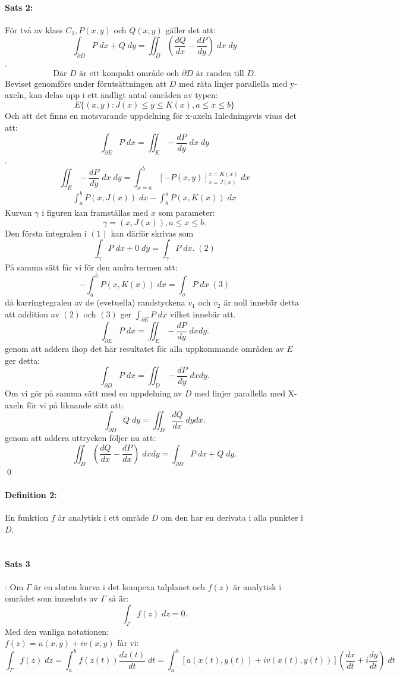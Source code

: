 \documentclass{article}
\begin{document}
\paragraph{Sats 2:} För två av klass $C_1, P(x, y)$ och $Q(x, y)$ gäller det att:
$$\int_{\partial D} P\; dx + Q \; dy = \iint_D \left ( \frac {d Q} {d x} - \frac {d P} {d y}
	\right ) \; dx \; dy$$.
$$\text{Där $D$ är ett kompakt område och $\partial D$ är randen till $D$.}$$
Beviset genomförs under förutsättningen att $D$ med räta linjer parallella med y-axeln, kan delas upp i ett 
ändligt antal områden av typen:
$$E \{ (x, y): J(x) \le y \le K(x), a \le x \le b \}$$
Och att det finns en motsvarande uppdelning för x-axeln
Inledningsvis visas det att:
$$\int_{\partial E} P \; dx = \iint_E - \frac {dP} {dy} \; dx \; dy$$.
$$\iint_E - \frac {dP} {dy} \; dx \; dy = \int^b_{x=a} \left [ -P (x, y) \right ]^{x = K(x)}_{x= J(x)} \; dx$$
\begin{align}
	\int_a^bP(x, J(x)) \; dx - \int_b^aP(x, K(x)) \; dx
\end{align}
Kurvan $\gamma$ i figuren kan framställas med $x$ som parameter:
$$\gamma = (x, J(x)), a\le x \le b.$$
Den första integralen i $(1)$ kan därför skrivas som 
$$\int_{\gamma} P \; dx + 0 \; dy = \int_{\gamma} P \; dx. \; (2)$$
På samma sätt får vi för den andra termen att:
$$- \int_a^b P(x, K(x)) \; dx = \int_{\sigma} P \; dx \; (3)$$ %
då karringtegralen av de (evetuella) randstyckena $v_1$ och $v_2$ är noll innebär detta att
addition av $(2)$ och $(3)$ ger $\int_{\partial E} P \; dx$ vilket
innebär att.
$$\int_{\partial E} P \; dx = \iint_E - \frac {dP} {dy} \; dx dy.$$
genom att addera ihop det här resultatet för alla uppkommande områden av $E$ ger detta:
$$\int_{\partial D} P \; dx = \iint_D - \frac {dP} {dy} \; dx dy.$$
Om vi gör på samma sätt med en uppdelning av $D$ med linjer parallella med X-axeln för vi på liknande sätt att:
$$\int_{\partial D} Q \; dy = \iint_D \frac {dQ} {dx} \; dy dx.$$ 
genom att addera uttrycken följer nu att:
$$\iint_D \left ( \frac {dQ} {dx} - \frac {dP} {dx} \right ) \; dx dy = \int_{\partial D} P \; dx + Q \; dy.$$
\hfill \qed
\paragraph{Definition 2:} En funktion $f$ är analytisk i ett område $D$ om den har en derivata i alla punkter i $D$.\\
\\
\paragraph{Sats 3}: Om $\Gamma$ är en sluten kurva i det kompexa talplanet och $f(z)$ är analytisk i området som innesluts av $\Gamma$ så är:
$$\int_{\Gamma} f(z) \; dz = 0.$$
Med den vanliga notationen:\\
$f(z) = u(x, y) + iv(x, y)$ får vi:
$$\int_{\Gamma} f(z) \; dz = \int_a^b f(z(t)) \frac {dz(t)} {dt} \; dt = \int_a^b [a(x(t), y(t)) + iv(x(t), y(t)) ]
\left ( \frac {dx} {dt} + i \frac {dy} {dt} \right ) \; dt$$
\end{document}
